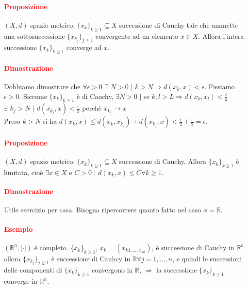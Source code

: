 \documentclass{article}
\newcommand{\R}{\mathbb{R}}
\begin{document}
\paragraph{\textcolor{red}{Proposizione}}
$(X,d)$ spazio metrico, $\{x_k\}_{k \geq 1} \subseteq X$ successione di Cauchy tale che ammette una sottosuccessione $\{x_{k_j}\}_{j\geq 1}$ convergente ad un elemento $x \in X$. Allora l'intera successione $\{x_k\}_{k\geq 1}$ converge ad $x$.

\paragraph{\textcolor{red}{Dimostrazione}}
Dobbiamo dimostrare che $\forall \epsilon >0 \,\,\exists \,\, N >0 \,\,|\,\, k > N \Rightarrow d(x_k,x)< \epsilon$. Fissiamo $\epsilon >0$. Siccome $\{x_k\}_{k\geq 1}$ è di Cauchy, $\exists N >0 \,\, |$ se  $k,l >L \Rightarrow d(x_k,x_l)< \frac{\epsilon}{2}$\\
$\exists \,\, k_j > N \,\,|\,\, d(x_{k_j},x)< \frac{\epsilon}{2}$ perchè $x_{k_j} \rightarrow x$\\
Preso $k > N$ si ha $d(x_k, x)\leq d(x_k,x_{k_j})+d(x_{k_j},x)<\frac{\epsilon}{2}+\frac{\epsilon}{2}=\epsilon$.
\begin{flushright}
\large\Lightning
\end{flushright}

\paragraph{\textcolor{red}{Proposizione}}
$(X,d)$ spazio metrico, $\{x_k\}_{k \geq 1} \subseteq X$ successione di Cauchy. Allora $\{x_k\}_{k \geq 1}$ è limitata, cioè $\exists x \in X$ e $C >0 \,\, |\,\, d(x_k,x)\leq C \forall k \geq 1$.

\paragraph{\textcolor{red}{Dimostrazione}}
Utile esercizio per casa. Bisogna ripercorrere quanto fatto nel caso $x = \R$.

\paragraph{\textcolor{red}{Esempio}}
$(\R^n,|\cdot|)$ è completo. $\{\overline{x_k}\}_{k\geq 1}$, $\overline{x_k} =(x_{k1, ..., x_{kn}})$, è successione di Cauchy in $\R^n$ allora $\{x_{k_j}\}_{j \geq 1}$ è successione di Cauhcy in $\R \forall j = 1,...,n$, e quindi le successioni delle componenti di $\{\overline{x_k}\}_{k \geq 1}$ convergono in $\R$, $\Rightarrow$ la successione $\{\overline{x_k}\}_{k \geq 1}$ converge in $\R^n$.
\end{document}
